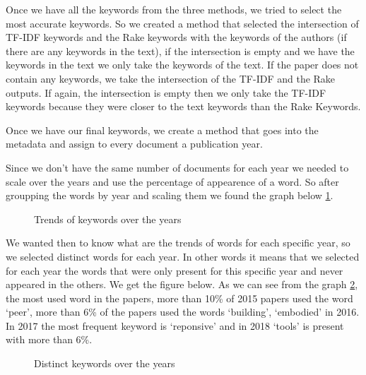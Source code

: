 \documentclass[article,twocolumn]{IEEEtran}
\begin{document}
Once we have all the keywords from the three methods, we tried to select
the most accurate keywords. So we created a method that selected the
intersection of TF-IDF keywords and the Rake keywords with the keywords
of the authors (if there are any keywords in the text), if the
intersection is empty and we have the keywords in the text we only take
the keywords of the text. If the paper does not contain any keywords, we
take the intersection of the TF-IDF and the Rake outputs. If again, the
intersection is empty then we only take the TF-IDF keywords because they
were closer to the text keywords than the Rake Keywords.

Once we have our final keywords, we create a method that goes into the
metadata and assign to every document a publication year.


    Since we don't have the same number of documents for each year we needed
to scale over the years and use the percentage of appearence of a word.
So after groupping the words by year and scaling them we found the graph
below \ref{fig1}.


    \begin{figure}
        \begin{center}\end{center}
        \caption{Trends of keywords over the years}
        \label{fig1}
    \end{figure}
    
    We wanted then to know what are the trends of words for each specific
year, so we selected distinct words for each year. In other words it
means that we selected for each year the words that were only present
for this specific year and never appeared in the others. We get the
figure below. As we can see from the graph \ref{fig2}, the most used
word in the papers, more than 10\% of 2015 papers used the word `peer',
more than 6\% of the papers used the words `building', `embodied' in
2016. In 2017 the most frequent keyword is `reponsive' and in 2018
`tools' is present with more than 6\%.


    \begin{figure}
        \begin{center}\end{center}
        \caption{Distinct keywords over the years}
        \label{fig2}
    \end{figure}
    
\end{document}
